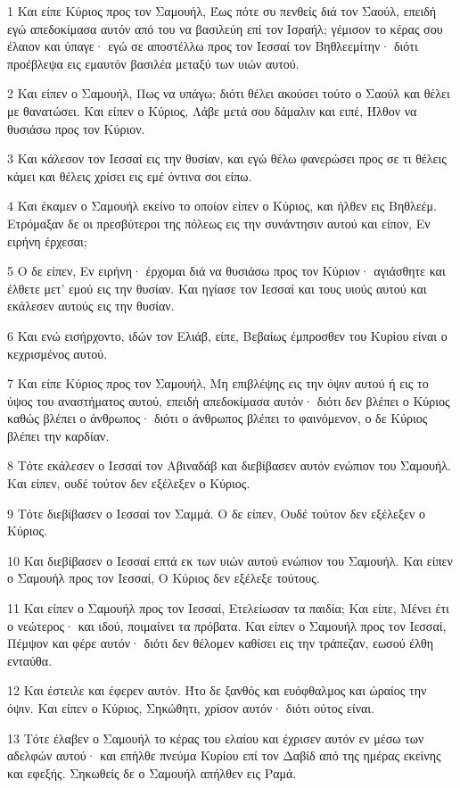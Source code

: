 \par 1 Και είπε Κύριος προς τον Σαμουήλ, Έως πότε συ πενθείς διά τον Σαούλ, επειδή εγώ απεδοκίμασα αυτόν από του να βασιλεύη επί τον Ισραήλ; γέμισον το κέρας σου έλαιον και ύπαγε· εγώ σε αποστέλλω προς τον Ιεσσαί τον Βηθλεεμίτην· διότι προέβλεψα εις εμαυτόν βασιλέα μεταξύ των υιών αυτού.
\par 2 Και είπεν ο Σαμουήλ, Πως να υπάγω; διότι θέλει ακούσει τούτο ο Σαούλ και θέλει με θανατώσει. Και είπεν ο Κύριος, Λάβε μετά σου δάμαλιν και ειπέ, Ήλθον να θυσιάσω προς τον Κύριον.
\par 3 Και κάλεσον τον Ιεσσαί εις την θυσίαν, και εγώ θέλω φανερώσει προς σε τι θέλεις κάμει και θέλεις χρίσει εις εμέ όντινα σοι είπω.
\par 4 Και έκαμεν ο Σαμουήλ εκείνο το οποίον είπεν ο Κύριος, και ήλθεν εις Βηθλεέμ. Ετρόμαξαν δε οι πρεσβύτεροι της πόλεως εις την συνάντησιν αυτού και είπον, Εν ειρήνη έρχεσαι;
\par 5 Ο δε είπεν, Εν ειρήνη· έρχομαι διά να θυσιάσω προς τον Κύριον· αγιάσθητε και έλθετε μετ' εμού εις την θυσίαν. Και ηγίασε τον Ιεσσαί και τους υιούς αυτού και εκάλεσεν αυτούς εις την θυσίαν.
\par 6 Και ενώ εισήρχοντο, ιδών τον Ελιάβ, είπε, Βεβαίως έμπροσθεν του Κυρίου είναι ο κεχρισμένος αυτού.
\par 7 Και είπε Κύριος προς τον Σαμουήλ, Μη επιβλέψης εις την όψιν αυτού ή εις το ύψος του αναστήματος αυτού, επειδή απεδοκίμασα αυτόν· διότι δεν βλέπει ο Κύριος καθώς βλέπει ο άνθρωπος· διότι ο άνθρωπος βλέπει το φαινόμενον, ο δε Κύριος βλέπει την καρδίαν.
\par 8 Τότε εκάλεσεν ο Ιεσσαί τον Αβιναδάβ και διεβίβασεν αυτόν ενώπιον του Σαμουήλ. Και είπεν, ουδέ τούτον δεν εξέλεξεν ο Κύριος.
\par 9 Τότε διεβίβασεν ο Ιεσσαί τον Σαμμά. Ο δε είπεν, Ουδέ τούτον δεν εξέλεξεν ο Κύριος.
\par 10 Και διεβίβασεν ο Ιεσσαί επτά εκ των υιών αυτού ενώπιον του Σαμουήλ. Και είπεν ο Σαμουήλ προς τον Ιεσσαί, Ο Κύριος δεν εξέλεξε τούτους.
\par 11 Και είπεν ο Σαμουήλ προς τον Ιεσσαί, Ετελείωσαν τα παιδία; Και είπε, Μένει έτι ο νεώτερος· και ιδού, ποιμαίνει τα πρόβατα. Και είπεν ο Σαμουήλ προς τον Ιεσσαί, Πέμψον και φέρε αυτόν· διότι δεν θέλομεν καθίσει εις την τράπεζαν, εωσού έλθη ενταύθα.
\par 12 Και έστειλε και έφερεν αυτόν. Ήτο δε ξανθός και ευόφθαλμος και ώραίος την όψιν. Και είπεν ο Κύριος, Σηκώθητι, χρίσον αυτόν· διότι ούτος είναι.
\par 13 Τότε έλαβεν ο Σαμουήλ το κέρας του ελαίου και έχρισεν αυτόν εν μέσω των αδελφών αυτού· και επήλθε πνεύμα Κυρίου επί τον Δαβίδ από της ημέρας εκείνης και εφεξής. Σηκωθείς δε ο Σαμουήλ απήλθεν εις Ραμά.
